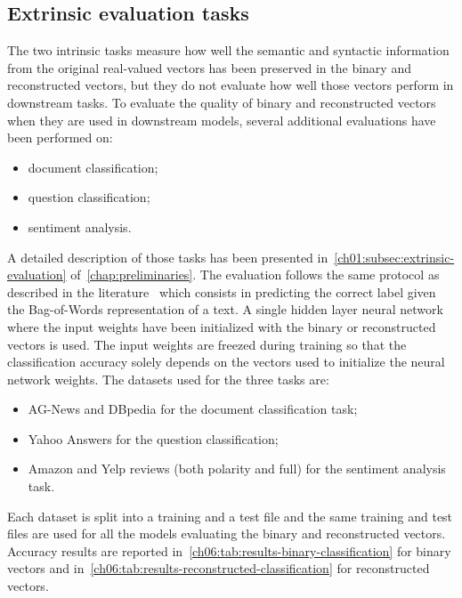   \subsection{Extrinsic evaluation tasks}
    \label{ch06:subsec:protocol-extrinsic-tasks}
    The two intrinsic tasks measure how well the semantic and syntactic
    information from the original real-valued vectors has been preserved in the
    binary and reconstructed vectors, but they do not evaluate how well those
    vectors perform in downstream tasks. To evaluate the quality of binary and
    reconstructed vectors when they are used in downstream models, several
    additional evaluations have been performed on:
    \begin{itemize}
      \item document classification;
      \item question classification;
      \item sentiment analysis.
    \end{itemize}
    A detailed description of those tasks has been presented
    in~\autoref{ch01:subsec:extrinsic-evaluation}
    of~\autoref{chap:preliminaries}. The evaluation follows the same protocol as
    described in the literature~\citep{zhang2015character, joulin2016bag} which
    consists in predicting the correct label given the Bag-of-Words
    representation of a text. A single hidden layer neural network where the
    input weights have been initialized with the binary or reconstructed vectors
    is used. The input weights are freezed during training so that the
    classification accuracy solely depends on the vectors used to initialize the
    neural network weights. The datasets used for the three tasks are:
    \begin{itemize}
      \item AG-News and DBpedia for the document classification task;
      \item Yahoo Answers for the question classification;
      \item Amazon and Yelp reviews (both polarity and full) for the sentiment
        analysis task.
    \end{itemize}
    Each dataset is split into a training and a test file and the same training
    and test files are used for all the models evaluating the binary and
    reconstructed vectors. Accuracy results are
    reported in~\autoref{ch06:tab:results-binary-classification} for binary
    vectors and in~\autoref{ch06:tab:results-reconstructed-classification} for
    reconstructed vectors.

